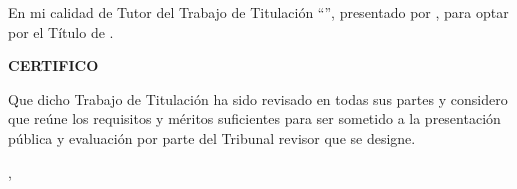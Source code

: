 \clearpage
{}
En mi calidad de Tutor del Trabajo de Titulación ``\TemaTexto'', presentado por
\Autor, para optar por el Título de \TituloAObtener.

\vspace{4mm}
\begin{center}\bfseries CERTIFICO\end{center}
\vspace{2mm}

Que dicho Trabajo de Titulación ha sido revisado en todas sus partes y considero
que reúne los requisitos y méritos suficientes para ser sometido a la
presentación pública y evaluación por parte del Tribunal revisor que se designe.

\vspace{10mm}
\CiudadTexto, \FechaAprobacion

\vspace{22mm}
\lineafirma{\TutorAprobacion}
